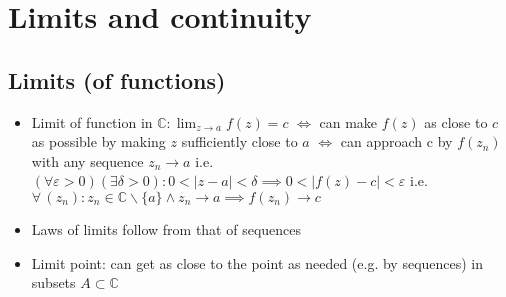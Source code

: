 \section{Limits and continuity}
\subsection*{Limits (of functions)}
\begin{itemize}
      \item Limit of function in $\mathbb{C} :\displaystyle \lim_{z \to a} f(z) = c$
            \newline $\iff$ can make $f(z)$ as close to $c$ as possible by making $z$ sufficiently close to $a$
            \newline $\iff$ can approach c by $f(z_n)$ with any sequence $z_n \to a$
            \newline i.e. $(\forall \varepsilon >0)(\exists \delta>0) \colon 0<|z-a|<\delta \implies 0 < |f(z) -c| < \varepsilon $
            \newline i.e. $\forall \, (z_n): z_n \in \mathbb{C} \backslash \{a\} \wedge z_n \to a \implies f(z_n) \to c$
      \item Laws of limits follow from that of sequences
      \item Limit point: can get as close to the point as needed (e.g. by sequences) in subsets $ A\subset \mathbb{C} $

\end{itemize}

